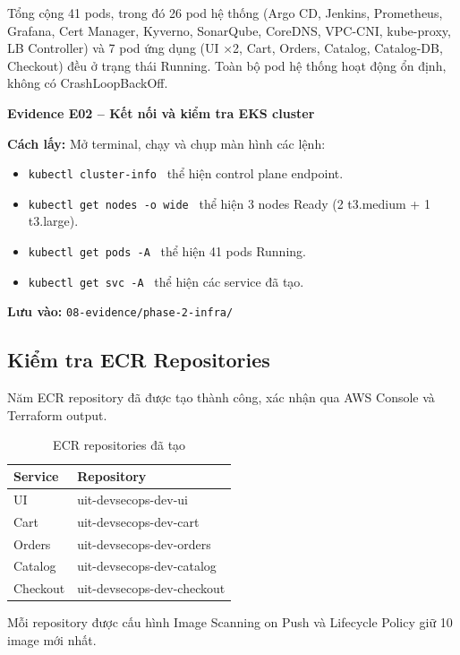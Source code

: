 \documentclass[13pt,a4paper,twoside]{extarticle}
\newcommand{\evidence}[1]{%
  \begin{evidencebox}
  #1
  \end{evidencebox}
}
\begin{document}
Tổng cộng 41 pods, trong đó 26 pod hệ thống (Argo CD, Jenkins, Prometheus, Grafana, Cert Manager, Kyverno, SonarQube, CoreDNS, VPC-CNI, kube-proxy, LB Controller) và 7 pod ứng dụng (UI ×2, Cart, Orders, Catalog, Catalog-DB, Checkout) đều ở trạng thái Running. Toàn bộ pod hệ thống hoạt động ổn định, không có CrashLoopBackOff.

\evidence{
\textbf{Evidence E02 -- Kết nối và kiểm tra EKS cluster}

\smallskip
\textbf{Cách lấy:} Mở terminal, chạy và chụp màn hình các lệnh:
\begin{itemize}[leftmargin=*,nosep]
  \item \texttt{kubectl cluster-info} \textrightarrow\ thể hiện control plane endpoint.
  \item \texttt{kubectl get nodes -o wide} \textrightarrow\ thể hiện 3 nodes Ready (2 t3.medium + 1 t3.large).
  \item \texttt{kubectl get pods -A} \textrightarrow\ thể hiện 41 pods Running.
  \item \texttt{kubectl get svc -A} \textrightarrow\ thể hiện các service đã tạo.
\end{itemize}
\textbf{Lưu vào:} \texttt{08-evidence/phase-2-infra/}
}

\subsection{Kiểm tra ECR Repositories}

Năm ECR repository đã được tạo thành công, xác nhận qua AWS Console và Terraform output.

\begin{table}[H]
\centering
\begin{tabular}{@{}p{9.5cm} p{5.5cm}@{}}
\toprule
\textbf{Service} & \textbf{Repository} \\
\midrule
UI & uit-devsecops-dev-ui \\
Cart & uit-devsecops-dev-cart \\
Orders & uit-devsecops-dev-orders \\
Catalog & uit-devsecops-dev-catalog \\
Checkout & uit-devsecops-dev-checkout \\
\bottomrule
\end{tabular}
\caption{ECR repositories đã tạo}
\label{tab:ecr-repos}
\end{table}

Mỗi repository được cấu hình Image Scanning on Push và Lifecycle Policy giữ 10 image mới nhất.
\end{document}
